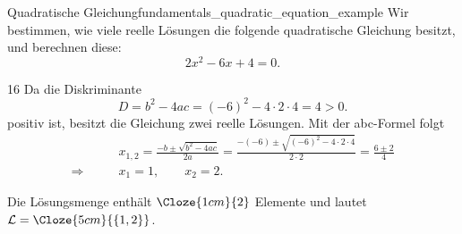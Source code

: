 \begin{ExampleBox}{Quadratische Gleichung}{fundamentals_quadratic_equation_example}
  Wir bestimmen, wie viele reelle Lösungen die folgende quadratische Gleichung
  besitzt, und berechnen diese:
  \[
    2x^2-6x+4=0.
  \]
  \begin{ClozeArea}[34]{16}
    Da die Diskriminante
    \[
      D=b^2-4ac=(-6)^2-4\cdot2\cdot4=4>0.
    \]
    positiv ist, besitzt die Gleichung zwei reelle Lösungen. Mit der abc-Formel folgt
    \begin{align*}
      &x_{1,2} = \frac{-b\pm\sqrt{b^2-4ac}}{2a} = \frac{-(-6)\pm\sqrt{(-6)^2-4\cdot2\cdot4}}{2\cdot2} = \frac{6\pm2}{4} \\
      \Longrightarrow \qquad &x_1=1, \qquad x_2=2.
    \end{align*}
  \end{ClozeArea}
  Die Lösungsmenge enthält $\Cloze{1cm}{2}$ Elemente und lautet $\mathcal{L}=\Cloze{5cm}{\{1,2\}}$.
\end{ExampleBox}
